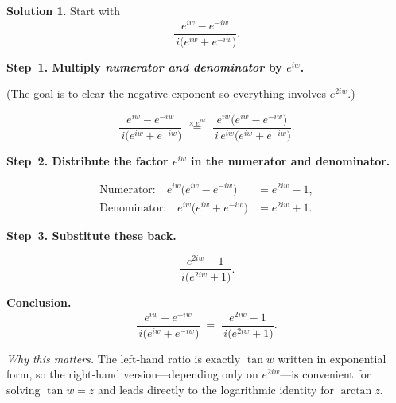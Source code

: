 \documentclass[12pt]{article}
\theoremstyle{definition} %
\newtheorem{solution}{Solution}
\theoremstyle{plain} %
\begin{document}
        \begin{solution}
          Start with
          \[
             \frac{e^{iw}-e^{-iw}}{\,i\bigl(e^{iw}+e^{-iw}\bigr)}.
          \]
          
          \bigskip
          \textbf{Step 1.  Multiply \emph{numerator and denominator} by $e^{iw}$.}
          
          (The goal is to clear the negative exponent so everything involves
          $e^{2iw}$.)
          
          \[
          \frac{e^{iw}-e^{-iw}}{\,i\bigl(e^{iw}+e^{-iw}\bigr)}
          \;
          \overset{\times\,e^{iw}}{=}\;
          \frac{e^{iw}\bigl(e^{iw}-e^{-iw}\bigr)}
               {\,i\,e^{iw}\bigl(e^{iw}+e^{-iw}\bigr)}.
          \]
          
          \bigskip
          \textbf{Step 2.  Distribute the factor $e^{iw}$ in the numerator and
          denominator.}
          
          \[
          \begin{aligned}
          \text{Numerator:}\quad
          e^{iw}\bigl(e^{iw}-e^{-iw}\bigr)
                &=e^{2iw}-1,\\[4pt]
          \text{Denominator:}\quad
          e^{iw}\bigl(e^{iw}+e^{-iw}\bigr)
                &=e^{2iw}+1.
          \end{aligned}
          \]
          
          \bigskip
          \textbf{Step 3.  Substitute these back.}
          
          \[
             \frac{e^{2iw}-1}{\,i\bigl(e^{2iw}+1\bigr)}.
          \]
          
          \bigskip
          \textbf{Conclusion.}\;
          \[
             \boxed{
               \displaystyle
               \frac{e^{iw}-e^{-iw}}{\,i\bigl(e^{iw}+e^{-iw}\bigr)}
               \;=\;
               \frac{e^{2iw}-1}{\,i\bigl(e^{2iw}+1\bigr)}
             }.
          \]
          
          \medskip
          \emph{Why this matters.}  
          The left‑hand ratio is exactly \(\tan w\) written in exponential form, so the
          right‑hand version—depending only on \(e^{2iw}\)—is convenient for solving
          \(\tan w=z\) and leads directly to the logarithmic identity for \(\arctan z\).
          \end{solution}
\end{document}
